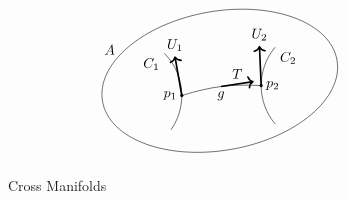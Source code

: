\documentclass[../../main]{subfiles}
\begin{document}
\begin{figure}[h!]
\[
\begin{tikzpicture}
    \coordinate (P1) at (-1,-0.125);
    \coordinate (P2) at (1,0.125);
    
    \draw (P1)
        to[bend left=10] 
        coordinate[midway](G) 
        node[midway, anchor=north] {$g$}
        (P2);
    \draw[very thick, ->] 
        (G) 
        to 
        node[midway, anchor=south] {$T$}
        ++(0.825,0.125);
    
    \draw (P1) arc (0:45:1.5cm) node[anchor=north east] {$C_1$};
    \draw (P1) arc (0:-35:1.5cm);
    
    \draw (P2) arc (180:140:1.5cm) node[anchor=north west] {$C_2$};
    \draw (P2) arc (180:220:1.5cm);
    
    \draw[very thick, ->] (P1) to ++(100:1) node[anchor=south] {$U_1$};
    \draw[very thick, ->] (P2) to ++(92.5:1) node[anchor=south] {$U_2$};
    
    \foreach \i/\j in {1/east,2/west}
    {
        \filldraw (P\i) circle (1pt) node[anchor=\j] {$p_\i$};
    }
    
    \draw[rotate=10] (0,0.25) ellipse (3cm and 1.75cm);
    \draw (160:3) node {$A$};
\end{tikzpicture}
\]
\caption{Cross Manifolds}
\label{fig:ch10fig4}
\end{figure}
\end{document}
